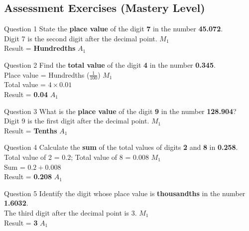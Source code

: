 \documentclass[12pt, a4paper, oneside]{article}
\begin{document}
\subsection*{Assessment Exercises (Mastery Level)}

\begin{solvingbox}{Question 1}
State the \textbf{place value} of the digit \textbf{7} in the number \textbf{45.072}. \\
Digit 7 is the second digit after the decimal point. \hfill $M_1$ \\
Result = \textbf{Hundredths} \hfill $A_1$
\end{solvingbox}

\begin{solvingbox}{Question 2}
Find the \textbf{total value} of the digit \textbf{4} in the number \textbf{0.345}. \\
Place value = Hundredths ($\frac{1}{100}$) \hfill $M_1$ \\
Total value = $4 \times 0.01$ \\
Result = \textbf{0.04} \hfill $A_1$
\end{solvingbox}

\begin{solvingbox}{Question 3}
What is the \textbf{place value} of the digit \textbf{9} in the number \textbf{128.904}? \\
Digit 9 is the first digit after the decimal point. \hfill $M_1$ \\
Result = \textbf{Tenths} \hfill $A_1$
\end{solvingbox}

\begin{solvingbox}{Question 4}
Calculate the \textbf{sum} of the total values of digits \textbf{2} and \textbf{8} in \textbf{0.258}. \\
Total value of 2 = $0.2$; Total value of 8 = $0.008$ \hfill $M_1$ \\
Sum = $0.2 + 0.008$ \\
Result = \textbf{0.208} \hfill $A_1$
\end{solvingbox}

\begin{solvingbox}{Question 5}
Identify the digit whose place value is \textbf{thousandths} in the number \textbf{1.6032}. \\
The third digit after the decimal point is 3. \hfill $M_1$ \\
Result = \textbf{3} \hfill $A_1$
\end{solvingbox}
\end{document}
